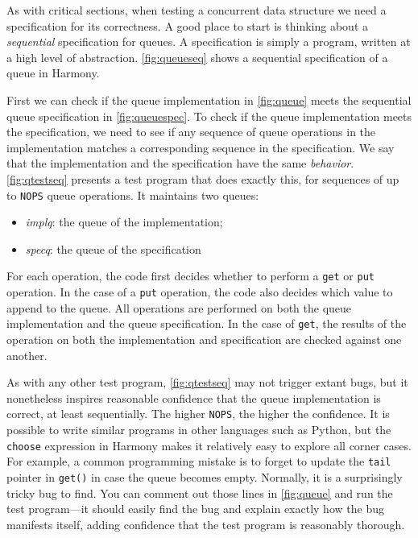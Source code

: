 \documentclass{report}
\begin{document}
As with critical sections, when testing a concurrent data structure
we need a specification for its correctness.
A good place to start is thinking about a \emph{sequential} specification
for queues.
A specification is simply a program, written at a high level of
abstraction.
\autoref{fig:queueseq} shows a sequential specification of a
queue in Harmony.

First we can check if the queue implementation
in \autoref{fig:queue} meets the sequential
queue specification in \autoref{fig:queuespec}.
To check if the queue implementation meets the specification,
we need to see if any sequence of queue operations in the
implementation matches a corresponding sequence in the
specification.
We say that the implementation and the specification
have the same \emph{behavior}.
%
\autoref{fig:qtestseq} presents a test program that does
exactly this, for sequences of up to \texttt{NOPS}
queue operations.
It maintains two queues:
\begin{itemize}
\item[] \textit{implq}: the queue of the implementation;
\item[] \textit{specq}: the queue of the specification
\end{itemize}
For each operation, the code first decides whether to
perform a \texttt{get} or \texttt{put} operation.
In the case of a \texttt{put} operation, the code also
decides which value to append to the queue.
All operations are performed on both the queue implementation
and the queue specification.
In the case of \texttt{get}, the results of the operation
on both the implementation and specification are checked against one another.

As with any other test program,
\autoref{fig:qtestseq} may not trigger extant bugs, but
it nonetheless inspires reasonable confidence that the
queue implementation is correct, at least sequentially.
The higher \texttt{NOPS}, the higher the confidence.
It is possible to write similar programs in other languages
such as Python, but the \texttt{choose} expression in Harmony
makes it relatively easy to explore all corner cases.
%
For example, a common programming mistake is to forget to
update the \texttt{tail} pointer in \texttt{get()} in case
the queue becomes empty.  Normally, it is a surprisingly
tricky bug to find.  You can comment out those lines
in \autoref{fig:queue} and run the test program---it should
easily find the bug and explain exactly how
the bug manifests itself, adding confidence that the test program
is reasonably thorough.
\end{document}
